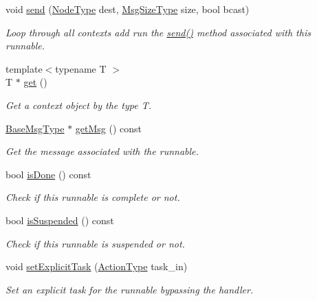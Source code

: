 \begin{DoxyCompactItemize}
void \hyperlink{structvt_1_1runnable_1_1_runnable_new_a997203eb54dc62151d11211384cf335f}{send} (\hyperlink{namespacevt_a866da9d0efc19c0a1ce79e9e492f47e2}{Node\+Type} dest, \hyperlink{namespacevt_a408e86a8c7c89309b52907dc5a513924}{Msg\+Size\+Type} size, bool bcast)
\begin{DoxyCompactList}\small\item\em Loop through all contexts add run the {\ttfamily \hyperlink{structvt_1_1runnable_1_1_runnable_new_a997203eb54dc62151d11211384cf335f}{send()}} method associated with this runnable. \end{DoxyCompactList}\item 
{\footnotesize template$<$typename T $>$ }\\T $\ast$ \hyperlink{structvt_1_1runnable_1_1_runnable_new_ab7cbde782a5ad0c67fa4c63f02e174ad}{get} ()
\begin{DoxyCompactList}\small\item\em Get a context object by the type {\ttfamily T}. \end{DoxyCompactList}\item 
\hyperlink{namespacevt_a44d0d4e144748f2b19a1cfd962f50338}{Base\+Msg\+Type} $\ast$ \hyperlink{structvt_1_1runnable_1_1_runnable_new_aed655dff826a821a3db9162259f33288}{get\+Msg} () const
\begin{DoxyCompactList}\small\item\em Get the message associated with the runnable. \end{DoxyCompactList}\item 
bool \hyperlink{structvt_1_1runnable_1_1_runnable_new_ad9acf28ef0fed7a7d63a9ca1d3ba3efc}{is\+Done} () const
\begin{DoxyCompactList}\small\item\em Check if this runnable is complete or not. \end{DoxyCompactList}\item 
bool \hyperlink{structvt_1_1runnable_1_1_runnable_new_af45b4443eee6dff57249bda0a9c2b7f0}{is\+Suspended} () const
\begin{DoxyCompactList}\small\item\em Check if this runnable is suspended or not. \end{DoxyCompactList}\item 
void \hyperlink{structvt_1_1runnable_1_1_runnable_new_aa30544adc03798c988a5e3bea2bfa3f3}{set\+Explicit\+Task} (\hyperlink{namespacevt_ae0a5a7b18cc99d7b732cb4d44f46b0f3}{Action\+Type} task\+\_\+in)
\begin{DoxyCompactList}\small\item\em Set an explicit task for the runnable bypassing the handler. \end{DoxyCompactList}\end{DoxyCompactItemize}
